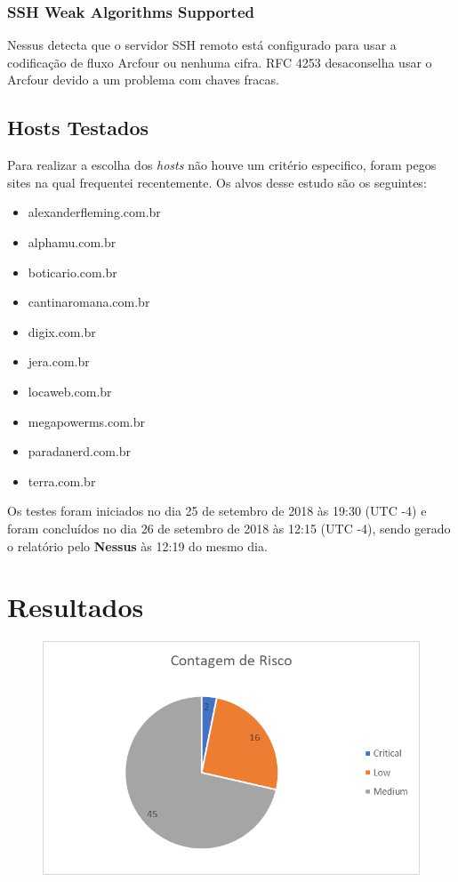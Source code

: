 \documentclass[
	12pt,				%
	openright,			%
	twoside,			%
	a4paper,			%
	english,			%
	french,				%
	spanish,			%
	brazil				%
	]{abntex2}
\begin{document}
\subsection{SSH Weak Algorithms Supported}
Nessus detecta que o servidor SSH remoto está configurado para usar a codificação de fluxo Arcfour ou nenhuma cifra. RFC 4253 desaconselha usar o Arcfour devido a um problema com chaves fracas.

\section{Hosts Testados}
Para realizar a escolha dos \textit{hosts} não houve um critério especifico, foram pegos sites na qual frequentei recentemente. Os alvos desse estudo são os seguintes:
\begin{itemize}
	\item alexanderfleming.com.br
	\item alphamu.com.br
	\item boticario.com.br
	\item cantinaromana.com.br
	\item digix.com.br
	\item jera.com.br
	\item locaweb.com.br
	\item megapowerms.com.br
	\item paradanerd.com.br
	\item terra.com.br
\end{itemize}
Os testes foram iniciados no dia 25 de setembro de 2018 às 19:30 (UTC -4) e foram concluídos no dia 26 de setembro de 2018 às 12:15 (UTC -4), sendo gerado o relatório pelo \textbf{Nessus} às 12:19 do mesmo dia.
\chapter{Resultados}
\begin{figure}[tb]
	\centering
	\includegraphics[width=0.7\linewidth]{Imagens/screenshot001}
	\caption[Contagem de Risco]{}
	\caption{}
	\label{contagem_de_risco}
\end{figure}
\end{document}
